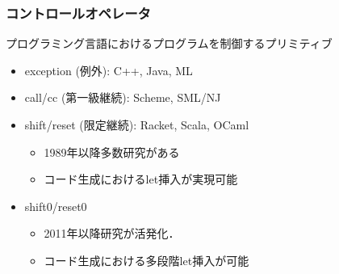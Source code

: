 \documentclass[dvipdfmx,cjk,xcolor=dvipsnames,envcountsect,notheorems,12pt]{beamer}
\newcommand\cResetz{\underline{\textbf{reset0}}}
\newcommand\cShiftz{\underline{\textbf{shift0}}}
\theoremstyle{definition}
\begin{document}
\begin{frame}
  \frametitle{コントロールオペレータ}
  \begin{block}{プログラミング言語におけるプログラムを制御するプリミティブ}
    \begin{itemize}
    \item exception (例外): C++, Java, ML
    \item call/cc (第一級継続): Scheme, SML/NJ
    \item shift/reset (限定継続): Racket, Scala, OCaml
      \begin{itemize}
      \item 1989年以降多数研究がある
      \item コード生成におけるlet挿入が実現可能
      \end{itemize}
    \item \alert{shift0/reset0}
      \begin{itemize}
        \item 2011年以降研究が活発化．
        \item コード生成における\alert{多段階let挿入}が可能
      \end{itemize}
    \end{itemize}
  \end{block}
\end{frame}





\end{document}
